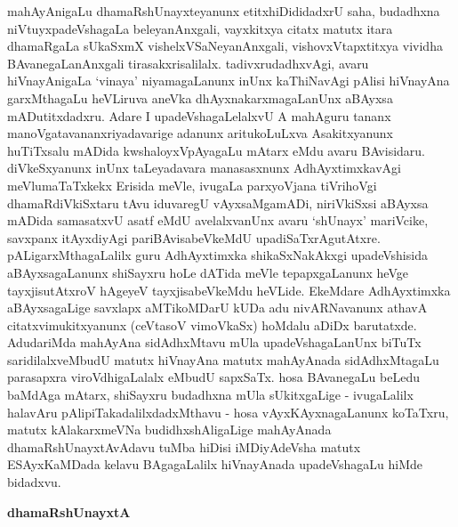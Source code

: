 mahAyAnigaLu dhamaRshUnayxteyanunx etitxhiDididadxrU saha, budadhxna niVtuyxpa\-deVshagaLa beleyanAnxgali, vayxkitxya citatx matutx itara dhamaRgaLa sUkaSxmX vishelxVSaNe\-yanAnxgali, vishovxVtapxtitxya vividha BAvanegaLanAnxgali tirasakxrisalilalx. tadivxrudadhxvAgi, avaru hiVnayAnigaLa `vinaya' niyamagaLanunx inUnx kaThiNavAgi pAlisi hiVnayAna garxMthagaLu heVLiruva aneVka dhAyxnakarxmagaLanUnx aBAyxsa mADutitxdadxru. Adare I upadeVshagaLelalxvU A mahAguru tananx manoVgatavananxriyadavarige adanunx aritukoLuLxva Asakitxyanunx huTiTxsalu mADida kwshaloyxVpAyagaLu mAtarx eMdu avaru BAvisidaru. diVkeSxyanunx inUnx taLeyadavara manasasxnunx AdhAyxtimxkavAgi meVlumaTaTxkekx Erisida meVle, ivugaLa parxyoVjana tiVrihoVgi dhamaRdiVkiSxtaru tAvu iduvaregU vAyxsaMgamADi, niriVkiSxsi aBAyxsa mADida samasatxvU asatf eMdU avelalxvanUnx avaru `shUnayx' mariVcike, savxpanx itAyxdiyAgi pariBAvisabeVkeMdU upadiSaTxrAgutAtxre. pALigarxMthagaLalilx guru AdhAyxtimxka shikaSxNakAkxgi upadeVshisida aBAyxsagaLanunx shiSayxru hoLe dATida meVle tepapxgaLanunx heVge tayxjisutAtxroV hAgeyeV tayxjisabeVkeMdu heVLide. EkeMdare AdhAyxtimxka aBAyxsagaLige savxlapx aMTikoMDarU kUDa adu nivARNavanunx athavA citatxvimukitxyanunx (ceVtasoV vimoVkaSx) hoMdalu aDiDx barutatxde. AdudariMda mahAyAna sidAdhxMtavu mUla upadeVshagaLanUnx biTuTx saridilalxveMbudU matutx hiVnayAna matutx mahAyAnada sidAdhxMtagaLu parasapxra viroVdhigaLalalx eMbudU sapxSaTx. hosa BAvanegaLu beLedu baMdAga mAtarx, shiSayxru budadhxna mUla sUkitxgaLige - ivugaLalilx halavAru pAlipiTakadalilxdadxMthavu - hosa vAyxKAyxnagaLanunx koTaTxru, matutx kAlakarxmeVNa budidhxshAligaLige mahAyAnada dhamaRshUnayxtAvAdavu tuMba hiDisi iMDiyAdeVsha matutx ESAyxKaMDada kelavu BAgagaLalilx hiVnayAnada upadeVshagaLu hiMde bidadxvu.

\begin{center}
{\textbf{\Large dhamaRshUnayxtA}}
\end{center}

